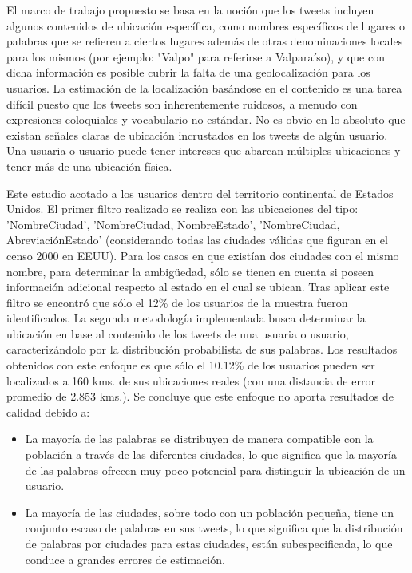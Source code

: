El marco de trabajo propuesto se basa en la noción que los tweets incluyen algunos contenidos de ubicación específica, como nombres específicos de lugares o palabras que se refieren a ciertos lugares además de otras denominaciones locales para los mismos (por ejemplo: "Valpo" para referirse a Valparaíso), y que con dicha información es posible cubrir la falta de una geolocalización para los usuarios. La estimación de la localización basándose en el contenido es una tarea difícil puesto que los tweets son inherentemente ruidosos, a menudo con expresiones coloquiales y vocabulario no estándar. No es obvio en lo absoluto que existan señales claras de ubicación incrustados en los tweets de algún usuario. Una usuaria o usuario puede tener intereses que abarcan múltiples ubicaciones y tener más de una ubicación física.

Este estudio acotado a los usuarios dentro del territorio continental de Estados Unidos. El primer filtro realizado se realiza con las ubicaciones del tipo: 'NombreCiudad', 'NombreCiudad, NombreEstado', 'NombreCiudad, AbreviaciónEstado' (considerando todas las ciudades válidas que figuran en el censo 2000 en EEUU). Para los casos en que existían dos ciudades con el mismo nombre, para determinar la ambigüedad, sólo se tienen en cuenta si poseen información adicional respecto al estado en el cual se ubican. Tras aplicar este filtro se encontró que sólo el 12\% de los usuarios de la muestra fueron identificados. La segunda metodología implementada busca determinar la ubicación en base al contenido de los tweets de una usuaria o usuario, caracterizándolo por la distribución probabilista de sus palabras. Los resultados obtenidos con este enfoque es que sólo el 10.12\% de los usuarios pueden ser localizados a 160 kms. de sus ubicaciones reales (con una distancia de error promedio de 2.853 kms.). Se concluye que este enfoque no aporta resultados de calidad debido a:

\begin{itemize}
    \item La mayoría de las palabras se distribuyen de manera compatible con la población a través de las diferentes ciudades, lo que significa que la mayoría de las palabras ofrecen muy poco potencial para distinguir la ubicación de un usuario.
    \item La mayoría de las ciudades, sobre todo con un población pequeña, tiene un conjunto escaso de palabras en sus tweets, lo que significa que la distribución de palabras por ciudades para estas ciudades, están subespecificada, lo que conduce a grandes errores de estimación.
\end{itemize}

